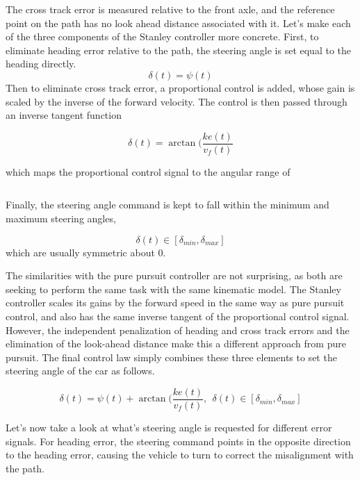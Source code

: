 The cross track error is measured relative to the front axle, and the reference point on the path has no look ahead distance associated with it. 
Let's make each of the three components of the Stanley controller more concrete. 
First, to eliminate heading error relative to the path, the steering angle is set equal to the heading directly. 
\begin{equation}
\delta(t) = \psi(t)
\end{equation}
Then to eliminate cross track error, a proportional control is added, whose gain is scaled by the inverse of the forward velocity. 
The control is then passed through an inverse tangent function 

\begin{equation}
\delta(t) = \arctan(\frac{ke(t)}{v_f(t)}
\end{equation}

which maps the proportional control signal to the angular range of

\begin{equation}
 [-\pi, \pi] 
\end{equation}

Finally, the steering angle command is kept to fall within the minimum and maximum steering angles, 

\begin{equation}
\delta(t) \in [\delta_{min}, \delta_{max}] 
\end{equation}
which are usually symmetric about 0. 

The similarities with the pure pursuit controller are not surprising, as both are seeking to perform the same task with the same kinematic model. 
The Stanley controller scales its gains by the forward speed in the same way as pure pursuit control, and also has the same inverse tangent of the proportional control signal. 
However, the independent penalization of heading and cross track errors and the elimination of the look-ahead distance make this a different approach from pure pursuit. 
The final control law simply combines these three elements to set the steering angle of the car as follows. 

\begin{equation}
\delta(t) = \psi(t) + \arctan(\frac{ke(t)}{v_f(t)}, ~~\delta(t) \in [\delta_{min}, \delta_{max}]
\end{equation}

Let's now take a look at what's steering angle is requested for different error signals. For heading error, the steering command points in the opposite direction to the heading error, causing the vehicle to turn to correct the misalignment with the path. 

